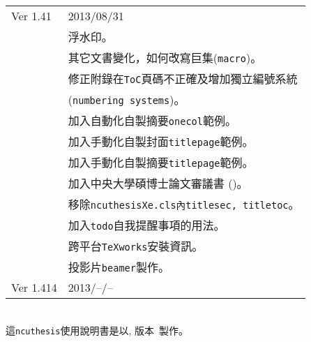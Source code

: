 \begin{tabular}{l@{:}l}
Ver 1.41 & 2013/08/31\\
&浮水印。\\
&其它文書變化，如何改寫巨集({\tt macro})。\\
&修正附錄在{\tt ToC}頁碼不正確及增加獨立編號系統\\
&({\tt numbering systems})。\\
& 加入自動化自製摘要{\tt onecol}範例。\\
& 加入手動化自製封面{\tt titlepage}範例。\\
& 加入手動化自製摘要{\tt titlepage}範例。\\
& 加入中央大學碩博士論文審議書 ()。\\
& 移除{\tt ncuthesisXe.cls內titlesec, titletoc}。\\
& 加入{\tt todo}自我提醒事項的用法。\\
& 跨平台{\tt TeXworks}安裝資訊。\\
& 投影片{\tt beamer}製作。\\
Ver 1.414 & 2013/--/--
\end{tabular}\\
這{\tt ncuthesis}使用說明書是以\fmtname, 版本~\fmtversion 製作。